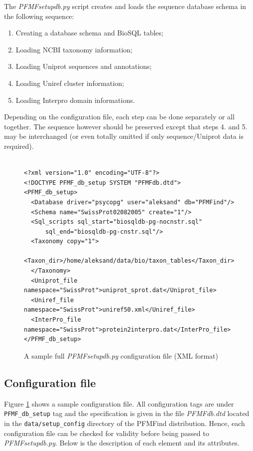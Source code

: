 \documentclass[10pt,letter]{article}
\begin{document}
The {\it PFMFsetupdb.py} script creates and loads the sequence database schema in the following sequence:
\begin{enumerate}
\item Creating a database schema and BioSQL tables;
\item Loading NCBI taxonomy information;
\item Loading Uniprot sequences and annotations;
\item Loading Uniref cluster information;
\item Loading Interpro domain informations.
\end{enumerate}
Depending on the configuration file, each step can be done separately or all together. The sequence however should be preserved except that steps 4. and 5. may be interchanged (or even totally omitted if only sequence/Uniprot data is required).



\begin{figure}[h!]
\begin{mdframed}
{\small
\begin{verbatim}

<?xml version="1.0" encoding="UTF-8"?>
<!DOCTYPE PFMF_db_setup SYSTEM "PFMFdb.dtd">
<PFMF_db_setup>
  <Database driver="psycopg" user="aleksand" db="PFMFind"/>
  <Schema name="SwissProt02082005" create="1"/>
  <Sql_scripts sql_start="biosqldb-pg-nocnstr.sql"
      sql_end="biosqldb-pg-cnstr.sql"/>
  <Taxonomy copy="1">
  <Taxon_dir>/home/aleksand/data/bio/taxon_tables</Taxon_dir>
  </Taxonomy>
  <Uniprot_file namespace="SwissProt">uniprot_sprot.dat</Uniprot_file>
  <Uniref_file namespace="SwissProt">uniref50.xml</Uniref_file>
  <InterPro_file namespace="SwissProt">protein2interpro.dat</InterPro_file>
</PFMF_db_setup>
\end{verbatim}
}
\caption{A sample full {\it PFMFsetupdb.py} configuration file (XML format)}\label{fig:config}
\end{mdframed}
\end{figure}

\subsection{Configuration file}\label{sec:dbconfig}

Figure \ref{fig:config} shows a sample configuration file. All configuration tags are under \texttt{ PFMF\_db\_setup} tag and the specification is given in the file {\it PFMFdb.dtd} located in the \verb|data/setup_config| directory of the PFMFind distribution. Hence, each configuration file can be checked for validity before being passed to {\it PFMFsetupdb.py}. Below is the description of each element and its attributes.
\end{document}
